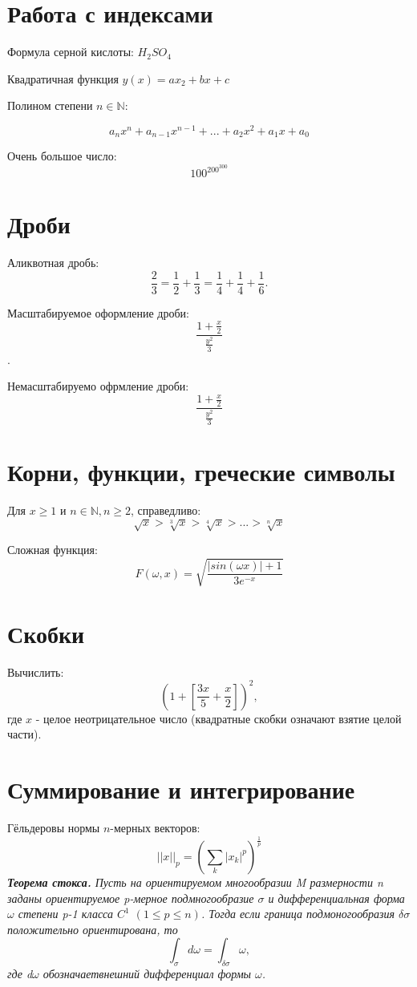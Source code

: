 \documentclass[12pt]{article}
\begin{document}
    
    \section{Работа с индексами}
    Формула серной кислоты: $H_2SO_4$

    Квадратичная функция $y(x) = ax_2+bx+c$

    Полином степени $n \in \mathbb{N} $:

        $$a_nx^n+a_{n-1}x^{n-1}+...+a_2x^2+a_1x+a_0$$


    Очень большое число:
    $$100^{200^{300}}$$

    \section{Дроби}
    
    Аликвотная дробь:
    $$ \frac{2}{3} = \frac{1}{2} +  \frac{1}{3} =  \frac{1}{4} +  \frac{1}{4}+  \frac{1}{6}.$$

    Масштабируемое оформление дроби:
    $$  \frac{1+ \frac{x}{2}}{ \frac{y^2}{3}} $$.

    Немасштабируемо офрмление дроби:
    $$  \frac{1+ \displaystyle\frac{x}{2}}{ \displaystyle\frac{y^2}{3}} $$

    \section{Корни, функции, греческие символы}

    Для $x \geqslant 1$ и $n \in \mathbb{N}, n \geqslant 2$, справедливо:
    $$
        \sqrt{x} > \sqrt[3]{x} > \sqrt[4]{x} > ... > \sqrt[n]{x}
    $$

    Сложная функция:
    $$
        F(\omega,x) = \sqrt{\frac{|sin(\omega x)|+1}{3e^{-x}}}
    $$

    \section{Скобки}
    Вычислить:
    $$
    \left (1+\left [\frac{3x}{5}+\frac{x}{2}\right ] \right )^2,
    $$
    где $x$ - целое неотрицательное число (квадратные скобки означают взятие целой части).

    \section{Суммирование и интегрирование}

    Гёльдеровы нормы $n$-мерных векторов:
    $$
        ||x||_p = \left(  \sum_{k}|x_k|^p\right)^\frac{1}{p}
    $$
    \textit{\textbf{Теорема стокса.} Пусть на ориентируемом многообразии M размерности n заданы ориентируемое p-мерное подмногообразие $\sigma$ и дифференциальная форма $\omega$ степени p-1 класса $C^1$ $(1\leqslant p\leqslant n)$. Тогда если граница подмоногообразия $\delta\sigma$ положительно ориентирована, то
    $$
    \int_\sigma d\omega = \int_{\delta\sigma}\omega,
    $$
    где d$\omega$ обозначаетвнешний дифференциал формы $\omega$.
    }
\end{document}
